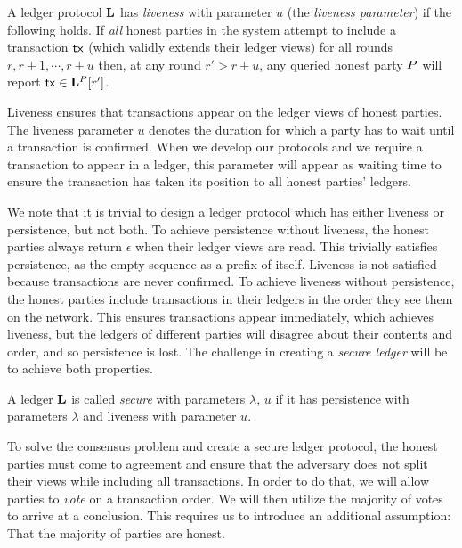 \begin{definition}[Liveness]
  A ledger protocol $\mathbf{L}$ has \emph{liveness} with parameter $u$ (the
  \emph{liveness parameter}) if the following holds.
  If \emph{all} honest parties in the system attempt to include a transaction
  $\mathsf{tx}$ (which validly extends their ledger views) for all rounds $r, r + 1, \cdots, r
  + u$ then, at any round $r' > r + u$, any queried honest party $P$ will
  report $\mathsf{tx} \in \mathbf{L}^{P}[r']$.
\end{definition}

Liveness ensures that transactions appear on the ledger views of honest parties.
The liveness parameter $u$ denotes the duration for which a party has to wait
until a transaction is confirmed. When we develop our protocols and we require
a transaction to appear in a ledger, this parameter will appear as waiting time
to ensure the transaction has taken its position to all honest parties' ledgers.

We note that it is trivial to design a ledger protocol which has either liveness
or persistence, but not both. To achieve persistence without liveness, the
honest parties always return $\epsilon$ when their ledger views are read. This
trivially satisfies persistence, as the empty sequence as a prefix of itself.
Liveness is not satisfied because transactions are never confirmed. To achieve
liveness without persistence, the honest parties include transactions in their
ledgers in the order they see them on the network. This ensures transactions
appear immediately, which achieves liveness, but the ledgers of different
parties will disagree about their contents and order, and so persistence is
lost. The challenge in creating a \emph{secure ledger} will be to achieve both
properties.

\begin{definition}
  A ledger $\mathbf{L}$ is called \emph{secure} with parameters $\lambda$, $u$ if
  it has persistence with parameters $\lambda$ and liveness with parameter $u$.
\end{definition}

To solve the consensus problem and create a secure ledger protocol, the honest
parties must come to agreement and ensure that the adversary does not split
their views while including all transactions. In order to do that, we will allow
parties to \emph{vote} on a transaction order. We will then utilize the majority
of votes to arrive at a conclusion. This requires us to introduce an additional
assumption: That the majority of parties are honest.
